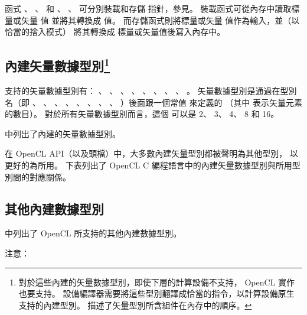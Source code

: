 函式 、 、 
 和 、 、 
 可分別裝載和存儲  指針，參見。
裝載函式可從內存中讀取標量或矢量  值 並將其轉換成  值。
而存儲函式則將標量或矢量  值作為輸入，並（以恰當的捨入模式）
將其轉換成  標量或矢量值後寫入內存中。


\subsection[sec:bivdt]{內建矢量數據型別\footnote{%
對於這些內建的矢量數據型別，即使下層的計算設備不支持， OpenCL 實作也要支持。
設備編譯器需要將這些型別翻譯成恰當的指令，以計算設備原生支持的內建型別。
 描述了矢量型別所含組件在內存中的順序。}}

支持的矢量數據型別有： 、 、 、
 、 、 、
 、 、 。
矢量數據型別是通過在型別名（即 、 、 、
 、 、 、 、 、
 ）後面跟一個常值  來定義的
（其中  表示矢量元素的數目）。
對於所有矢量數據型別而言，這個  可以是 2、 3、 4、 8 和 16。

中列出了內建的矢量數據型別。

{}

在 OpenCL API（以及頭檔）中，大多數內建矢量型別都被聲明為其他型別，
以更好的為所用。
下表列出了 OpenCL C 編程語言中的內建矢量數據型別與所用型別間的對應關係。



\subsection[sec:obidt]{其他內建數據型別}

中列出了 OpenCL 所支持的其他內建數據型別。

{}

注意：

